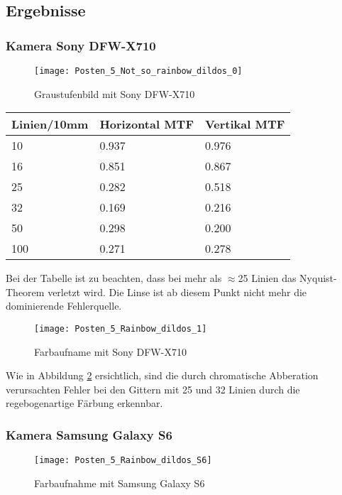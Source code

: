 \subsection{Ergebnisse}
\subsubsection{Kamera Sony DFW-X710}
\begin{figure}[h!]
  \centering
  \texttt{[image: Posten\_5\_Not\_so\_rainbow\_dildos\_0]}
  \caption{Graustufenbild mit Sony DFW-X710}
  \label{fig:p5g}
\end{figure}

\begin{table}[h!]
  \centering
  \begin{tabular}{l | l | l }
    Linien/10mm & Horizontal MTF &  Vertikal MTF \\\hline
    10 & 0.937 & 0.976 \\
    16 & 0.851 & 0.867 \\
    25 & 0.282 & 0.518\\
    32 & 0.169 & 0.216 \\
    50 & 0.298 & 0.200 \\
    100 & 0.271 & 0.278 \\
  \end{tabular}
\end{table}

Bei der Tabelle ist zu beachten, dass bei mehr als $\approx$25 Linien das Nyquist-Theorem verletzt wird. Die Linse ist ab diesem Punkt nicht mehr die dominierende Fehlerquelle.

\begin{figure}[H]
  \centering
  \texttt{[image: Posten\_5\_Rainbow\_dildos\_1]}
  \caption{Farbaufname mit Sony DFW-X710}
  \label{fig:p5c}
\end{figure}

Wie in Abbildung \ref{fig:p5c} ersichtlich, sind die durch chromatische Abberation verursachten Fehler bei den Gittern mit 25 und 32 Linien durch die regebogenartige Färbung erkennbar.

\subsubsection{Kamera Samsung Galaxy S6}
\begin{figure}[h!]
  \centering
  \texttt{[image: Posten\_5\_Rainbow\_dildos\_S6]}
  \caption{Farbaufnahme mit Samsung Galaxy S6}
  \label{fig:p5s}
\end{figure}

